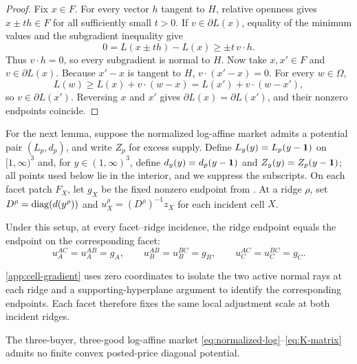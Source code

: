 \begin{proof}
Fix $x\in F$. For every vector $h$ tangent to $H$, relative openness gives $x\pm th\in F$ for all sufficiently small $t>0$. If $v\in\partial L(x)$, equality of the minimum values and the subgradient inequality give
\[
0=L(x\pm th)-L(x)\ge \pm t\,v\cdot h.
\]
Thus $v\cdot h=0$, so every subgradient is normal to $H$. Now take $x,x'\in F$ and $v\in\partial L(x)$. Because $x'-x$ is tangent to $H$, $v\cdot(x'-x)=0$. For every $w\in\Omega$,
\[
L(w)\ge L(x)+v\cdot(w-x)
=L(x')+v\cdot(w-x'),
\]
so $v\in\partial L(x')$. Reversing $x$ and $x'$ gives $\partial L(x)=\partial L(x')$, and their nonzero endpoints coincide.
\end{proof}

For the next lemma, suppose the normalized log-affine market admits a potential pair $(L_p,d_p)$, and write $Z_p$ for excess supply. Define $L_y(y)=L_p(y-\mathbf{1})$ on $[1,\infty)^3$ and, for $y\in(1,\infty)^3$, define $d_y(y)=d_p(y-\mathbf{1})$ and $Z_y(y)=Z_p(y-\mathbf{1})$; all points used below lie in the interior, and we suppress the subscripts. On each facet patch $F_X$, let $g_X$ be the fixed nonzero endpoint from . At a ridge $\rho$, set $D^\rho=\operatorname{diag}(d(y^\rho))$ and $u_X^\rho=(D^\rho)^{-1}z_X$ for each incident cell $X$.

\begin{lemma}\label{lem:ridge-transport}
Under this setup, at every facet--ridge incidence, the ridge endpoint equals the endpoint on the corresponding facet:
\[
u_A^{AC}=u_A^{AB}=g_A,
\qquad
u_B^{AB}=u_B^{BC}=g_B,
\qquad
u_C^{AC}=u_C^{BC}=g_C.
\]
\end{lemma}

\ref{app:cell-gradient} uses zero coordinates to isolate the two active normal rays at each ridge and a supporting-hyperplane argument to identify the corresponding endpoints. Each facet therefore fixes the same local adjustment scale at both incident ridges.

\begin{proposition}\label{prop:holonomy}
The three-buyer, three-good log-affine market \eqref{eq:normalized-log}--\eqref{eq:K-matrix} admits no finite convex posted-price diagonal potential.
\end{proposition}

